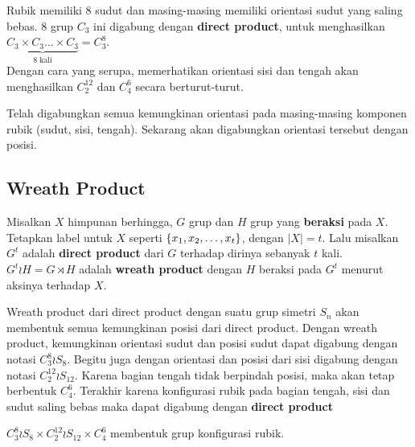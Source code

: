 \documentclass{article}
\begin{document}
\noindent Rubik memiliki 8 sudut dan masing-masing memiliki orientasi sudut yang saling bebas. 8 
grup $C_3$ ini digabung dengan \textbf{direct product}, untuk menghasilkan 
$\underbrace{C_3\times C_3\dots\times C_3}_\text{8 kali}= C_3^8$.\\
Dengan cara yang serupa, memerhatikan orientasi sisi dan tengah akan menghasilkan $C_2^{12}$ dan $C_4^6$ 
secara berturut-turut. 

Telah digabungkan semua kemungkinan orientasi pada masing-masing komponen rubik (sudut, sisi, tengah).
Sekarang akan digabungkan orientasi tersebut dengan posisi.

\subsection{Wreath Product}


\begin{definition}
    Misalkan $X$ himpunan berhingga, $G$ grup dan $H$ grup yang \textbf{beraksi} pada $X$. Tetapkan 
    label untuk $X$ seperti $\{x_1,x_2,\dots,x_t\}$, dengan $|X|=t$. Lalu misalkan $G^t$ 
    adalah \textbf{direct product} dari $G$ terhadap dirinya sebanyak $t$ kali. $G^t\wr H = G \rtimes H$
    adalah \textbf{wreath product} dengan $H$ beraksi pada $G^t$ menurut aksinya terhadap $X$.
\end{definition}

Wreath product dari direct product dengan suatu grup simetri $S_n$ akan membentuk semua kemungkinan 
posisi dari direct product. Dengan wreath product, kemungkinan orientasi sudut dan posisi sudut dapat digabung 
dengan notasi $C_3^8\wr S_8$. Begitu juga dengan orientasi dan posisi dari sisi digabung dengan notasi 
$C_2^{12}\wr S_{12}$. Karena bagian tengah tidak berpindah posisi, maka akan tetap berbentuk $C_4^6$. 
Terakhir karena konfigurasi rubik pada bagian tengah, sisi dan sudut saling bebas maka dapat 
digabung dengan \textbf{direct product}

\begin{lemma}
    $C_3^8\wr S_8 \times C_2^{12}\wr S_{12}\times C_4^6$ membentuk grup konfigurasi rubik.
\end{lemma}
\end{document}
